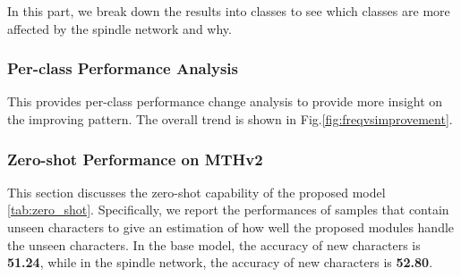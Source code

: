 In this part, we break down the results into classes to see which classes are more affected by the spindle network and why. 
\subsubsection{Per-class Performance Analysis}


This provides per-class performance change analysis to provide more insight on the improving pattern. 
The overall trend is shown in Fig.\ref{fig:freqvsimprovement}. 



\subsubsection{Zero-shot Performance on MTHv2}


This section discusses the zero-shot capability of the proposed model \ref{tab:zero_shot}. Specifically, we report the performances of samples that contain unseen characters to give an estimation of how well the proposed modules handle the unseen characters. In the base model, the accuracy of new characters is \textbf{51.24}, while in the spindle network, the accuracy of new characters is \textbf{52.80}. 


